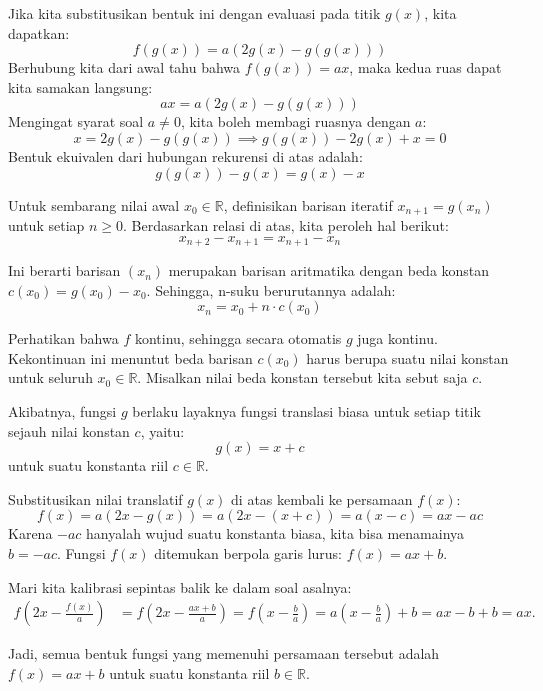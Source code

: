 \documentclass[11pt,a4paper]{article}
\newcommand{\R}{\mathbb{R}}
\begin{document}
\begin{enumerate}
        Jika kita substitusikan bentuk ini dengan evaluasi pada titik $g(x)$, kita dapatkan:
        \[
          f(g(x)) = a(2g(x) - g(g(x)))
        \]
        Berhubung kita dari awal tahu bahwa $f(g(x)) = ax$, maka kedua ruas dapat kita samakan langsung:
        \[
          ax = a(2g(x) - g(g(x)))
        \]
        Mengingat syarat soal $a \neq 0$, kita boleh membagi ruasnya dengan $a$:
        \[
          x = 2g(x) - g(g(x)) \implies g(g(x)) - 2g(x) + x = 0
        \]
        Bentuk ekuivalen dari hubungan rekurensi di atas adalah:
        \[
          g(g(x)) - g(x) = g(x) - x
        \]

        Untuk sembarang nilai awal $x_0 \in \R$, definisikan barisan iteratif $x_{n+1} = g(x_n)$ untuk setiap $n \ge 0$.
        Berdasarkan relasi di atas, kita peroleh hal berikut:
        \[
          x_{n+2} - x_{n+1} = x_{n+1} - x_n
        \]

        Ini berarti barisan $(x_n)$ merupakan barisan aritmatika dengan beda konstan $c(x_0) = g(x_0) - x_0$.
        Sehingga, n-suku berurutannya adalah:
        \[
          x_n = x_0 + n \cdot c(x_0)
        \]

        Perhatikan bahwa $f$ kontinu, sehingga secara otomatis $g$ juga kontinu.
        Kekontinuan ini menuntut beda barisan $c(x_0)$ harus berupa suatu nilai konstan untuk seluruh $x_0 \in \R$.
        Misalkan nilai beda konstan tersebut kita sebut saja $c$.

        Akibatnya, fungsi $g$ berlaku layaknya fungsi translasi biasa untuk setiap titik sejauh nilai konstan $c$, yaitu:
        \[
          g(x) = x + c
        \]
        untuk suatu konstanta riil $c \in \R$.

        Substitusikan nilai translatif $g(x)$ di atas kembali ke persamaan $f(x)$:
        \[
          f(x) = a(2x - g(x)) = a(2x - (x + c)) = a(x - c) = ax - ac
        \]
        Karena $-ac$ hanyalah wujud suatu konstanta biasa, kita bisa menamainya $b = -ac$. Fungsi $f(x)$ ditemukan berpola garis lurus: $f(x) = ax + b$.

        Mari kita kalibrasi sepintas balik ke dalam soal asalnya:
        \begin{align*}
          f\left(2x - \frac{f(x)}{a}\right) & = f\left(2x - \frac{ax + b}{a}\right) = f\left(x - \frac{b}{a}\right) = a\left(x - \frac{b}{a}\right) + b = ax - b + b = ax.
        \end{align*}

        Jadi, semua bentuk fungsi yang memenuhi persamaan tersebut adalah $f(x) = ax + b$ untuk suatu konstanta riil $b \in \R$.


\end{enumerate}
\end{document}
